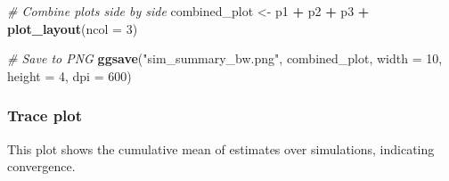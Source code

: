 \documentclass[
]{article}
\newenvironment{Shaded}{\begin{snugshade}}{\end{snugshade}}
\newcommand{\AttributeTok}[1]{\textcolor[rgb]{0.13,0.29,0.53}{#1}}
\newcommand{\CommentTok}[1]{\textcolor[rgb]{0.56,0.35,0.01}{\textit{#1}}}
\newcommand{\DecValTok}[1]{\textcolor[rgb]{0.00,0.00,0.81}{#1}}
\newcommand{\FunctionTok}[1]{\textcolor[rgb]{0.13,0.29,0.53}{\textbf{#1}}}
\newcommand{\NormalTok}[1]{#1}
\newcommand{\OtherTok}[1]{\textcolor[rgb]{0.56,0.35,0.01}{#1}}
\newcommand{\SpecialCharTok}[1]{\textcolor[rgb]{0.81,0.36,0.00}{\textbf{#1}}}
\newcommand{\StringTok}[1]{\textcolor[rgb]{0.31,0.60,0.02}{#1}}
\begin{document}
\begin{Shaded}
\begin{Highlighting}[]
\CommentTok{\# Combine plots side by side}
\NormalTok{combined\_plot }\OtherTok{\textless{}{-}}\NormalTok{ p1 }\SpecialCharTok{+}\NormalTok{ p2 }\SpecialCharTok{+}\NormalTok{ p3 }\SpecialCharTok{+} \FunctionTok{plot\_layout}\NormalTok{(}\AttributeTok{ncol =} \DecValTok{3}\NormalTok{)}

\CommentTok{\# Save to PNG}
\FunctionTok{ggsave}\NormalTok{(}\StringTok{"sim\_summary\_bw.png"}\NormalTok{, combined\_plot, }\AttributeTok{width =} \DecValTok{10}\NormalTok{, }\AttributeTok{height =} \DecValTok{4}\NormalTok{, }\AttributeTok{dpi =} \DecValTok{600}\NormalTok{)}
\end{Highlighting}
\end{Shaded}

\subsubsection{Trace plot}\label{trace-plot}

This plot shows the cumulative mean of estimates over simulations,
indicating convergence.
\end{document}
